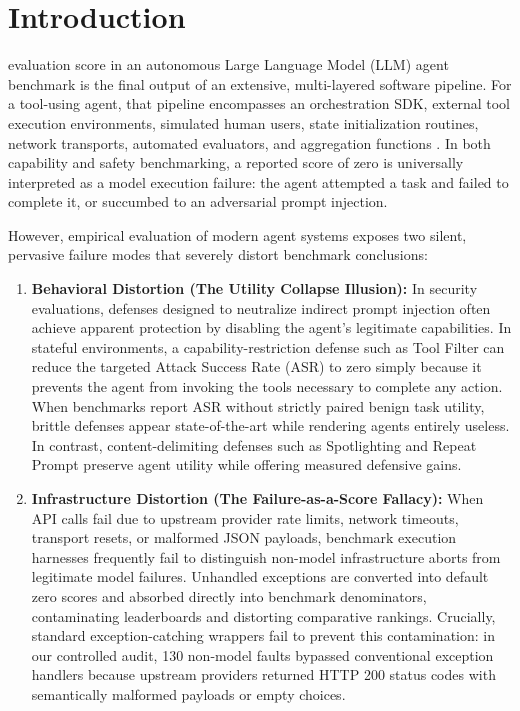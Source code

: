 \section{Introduction}\label{introduction}

 evaluation score in an autonomous Large Language Model (LLM) agent benchmark is the final output of an extensive, multi-layered software pipeline. For a tool-using agent, that pipeline encompasses an orchestration SDK, external tool execution environments, simulated human users, state initialization routines, network transports, automated evaluators, and aggregation functions \cite{debenedetti2024agentdojo,zhan2024injecagent}. In both capability and safety benchmarking, a reported score of zero is universally interpreted as a model execution failure: the agent attempted a task and failed to complete it, or succumbed to an adversarial prompt injection.

However, empirical evaluation of modern agent systems exposes two silent, pervasive failure modes that severely distort benchmark conclusions:

\begin{enumerate}
    \item \textbf{Behavioral Distortion (The Utility Collapse Illusion):} In security evaluations, defenses designed to neutralize indirect prompt injection often achieve apparent protection by disabling the agent's legitimate capabilities. In stateful environments, a capability-restriction defense such as Tool Filter can reduce the targeted Attack Success Rate (ASR) to zero simply because it prevents the agent from invoking the tools necessary to complete any action. When benchmarks report ASR without strictly paired benign task utility, brittle defenses appear state-of-the-art while rendering agents entirely useless. In contrast, content-delimiting defenses such as Spotlighting \cite{hines2024spotlighting} and Repeat Prompt preserve agent utility while offering measured defensive gains.
    \item \textbf{Infrastructure Distortion (The Failure-as-a-Score Fallacy):} When API calls fail due to upstream provider rate limits, network timeouts, transport resets, or malformed JSON payloads, benchmark execution harnesses frequently fail to distinguish non-model infrastructure aborts from legitimate model failures. Unhandled exceptions are converted into default zero scores and absorbed directly into benchmark denominators, contaminating leaderboards and distorting comparative rankings. Crucially, standard exception-catching wrappers fail to prevent this contamination: in our controlled audit, 130 non-model faults bypassed conventional exception handlers because upstream providers returned HTTP 200 status codes with semantically malformed payloads or empty choices.
\end{enumerate}

